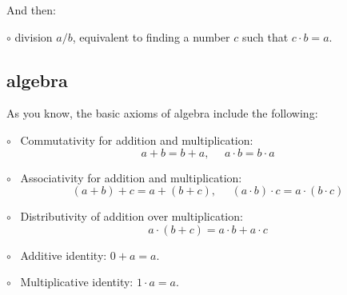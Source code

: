 \documentclass[11pt, oneside]{article}
\begin{document}
And then:

$\circ$ division $a/b$, equivalent to finding a number $c$ such that $c \cdot b = a$.

\subsection*{algebra}
As you know, the basic axioms of algebra include the following:

$\circ$ \ Commutativity for addition and multiplication: 
\[ a + b = b + a, \ \ \ \ \ \ a \cdot b = b \cdot a \]

$\circ$ \  Associativity for addition and multiplication:
\[ (a + b) + c = a + (b + c), \ \ \ \ \ \ (a \cdot b) \cdot c = a \cdot (b \cdot c) \]

$\circ$ \ Distributivity of addition over multiplication:  
\[ a \cdot (b + c) = a \cdot b + a \cdot c \]

$\circ$ \ Additive identity:  $0 + a = a$.

$\circ$ \ Multiplicative identity:  $1 \cdot a = a$.
\end{document}
